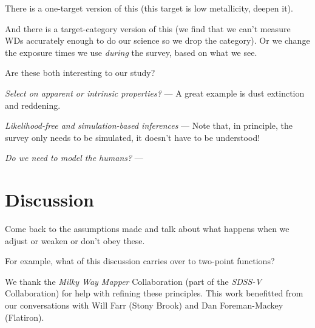\documentclass[modern]{aastex62}
\newcommand{\project}[1]{\textsl{#1}}
\renewcommand{\paragraph}[1]{\medskip\noindent\textit{#1} ---}
\begin{document}
There is a one-target version of this (this target is low metallicity, deepen it).

And there is a target-category version of this (we find that we can't measure WDs
accurately enough to do our science so we drop the category). Or we change the exposure
times we use \emph{during} the survey, based on what we see.

Are these both interesting to our study?

\paragraph{Select on apparent or intrinsic properties?}
A great example is dust extinction and reddening.

\paragraph{Likelihood-free and simulation-based inferences}
Note that, in principle, the survey only needs to be simulated, it doesn't have
to be understood!

\paragraph{Do we need to model the humans?}

\section{Discussion}

Come back to the assumptions made and talk about what happens when we
adjust or weaken or don't obey these.

For example, what of this discussion carries over to two-point functions?

\acknowledgements We thank the \project{Milky Way
  Mapper} Collaboration (part of the \project{SDSS-V} Collaboration)
for help with refining these principles.
This work benefitted from our conversations with
  Will Farr (Stony Brook) and
  Dan Foreman-Mackey (Flatiron).
\end{document}

